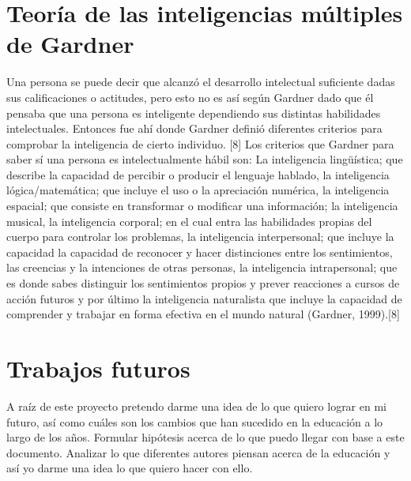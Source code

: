 \documentclass{bmcart}
\begin{document}
\section{Teoría de las inteligencias múltiples de Gardner}

Una persona se puede decir que alcanzó el desarrollo intelectual suficiente dadas sus calificaciones o actitudes, pero esto no es así según Gardner dado que él pensaba que una persona es inteligente dependiendo sus distintas habilidades intelectuales. Entonces fue ahí donde Gardner definió diferentes criterios para comprobar la inteligencia de cierto individuo. [8]
	\newline
	\newline
Los criterios que Gardner para saber sí una persona es intelectualmente hábil son: La inteligencia lingüística; que describe la capacidad de percibir o producir el lenguaje hablado,  la inteligencia lógica/matemática; que incluye el uso o la apreciación numérica, la inteligencia espacial; que consiste en transformar o modificar una información; la inteligencia musical, la inteligencia corporal; en el cual entra las habilidades propias del cuerpo para controlar los problemas, la inteligencia interpersonal; que incluye la capacidad la capacidad de reconocer y hacer distinciones entre los sentimientos, las creencias y la intenciones de otras personas, la inteligencia intrapersonal; que es donde sabes distinguir los sentimientos propios y prever reacciones a cursos de acción futuros y por último la inteligencia naturalista que incluye la capacidad de comprender y trabajar en forma efectiva en el mundo natural (Gardner, 1999).[8]




\newpage
\section{Trabajos futuros}
  
  A raíz de este proyecto pretendo darme una idea de lo que quiero lograr en mi futuro, así como cuáles son los cambios que han sucedido en la educación a lo largo de los años. Formular hipótesis acerca de lo que puedo llegar con base a este documento. Analizar lo que diferentes autores piensan acerca de la educación y así yo darme una idea lo que quiero hacer con ello.
  \
  \
  \
  \
\end{document}
